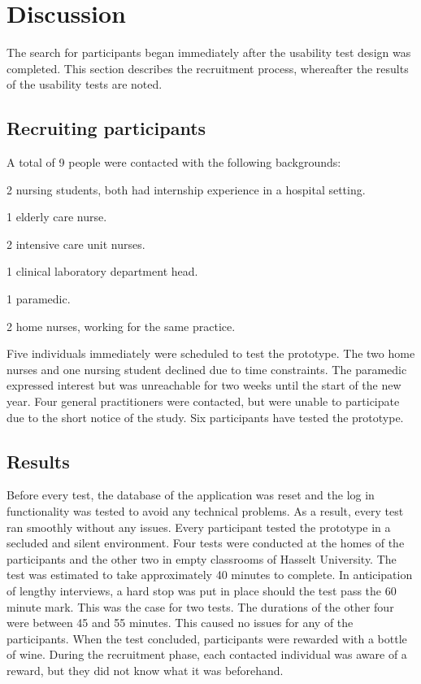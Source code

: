 \section{Discussion}\label{discussion}

The search for participants began immediately after the usability test design was completed. This section describes the recruitment process, whereafter the results of the usability tests are noted.

    \subsection{Recruiting participants}

    A total of 9 people were contacted with the following backgrounds:
    \vspace{-6pt}
    \begin{myitemize}
        \item 2 nursing students, both had internship experience in a hospital setting.
        \item 1 elderly care nurse.
        \item 2 intensive care unit nurses.
        \item 1 clinical laboratory department head.
        \item 1 paramedic.
        \item 2 home nurses, working for the same practice.
    \end{myitemize}

    \noindent Five individuals immediately were scheduled to test the prototype. The two home nurses and one nursing student declined due to time constraints. The paramedic expressed interest but was unreachable for two weeks until the start of the new year. Four general practitioners were contacted, but were unable to participate due to the short notice of the study. Six participants have tested the prototype.

    \subsection{Results}

    Before every test, the database of the application was reset and the log in functionality was tested to avoid any technical problems. As a result, every test ran smoothly without any issues. Every participant tested the prototype in a secluded and silent environment. Four tests were conducted at the homes of the participants and the other two in empty classrooms of Hasselt University. The test was estimated to take approximately 40 minutes to complete. In anticipation of lengthy interviews, a hard stop was put in place should the test pass the 60 minute mark. This was the case for two tests. The durations of the other four were between 45 and 55 minutes. This caused no issues for any of the participants. When the test concluded, participants were rewarded with a bottle of wine. During the recruitment phase, each contacted individual was aware of a reward, but they did not know what it was beforehand. %

